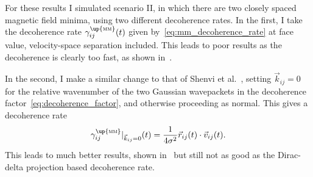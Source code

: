 For these results I simulated scenario II, in which there are two closely spaced magnetic field minima, using two different decoherence rates. In the first, I take the decoherence rate $\gamma^\up{\textsc{mm}}_{ij}(t)$ given by~\eqref{eq:mm_decoherence_rate} at face value, velocity-space separation included. This leads to poor results as the decoherence is clearly too fast, as shown in~.

In the second, I make a similar change to that of Shenvi et al.~\cite{doi:10.1063/1.3575588}, setting $\vec k_{ij} = 0$ for the relative wavenumber of the two Gaussian wavepackets in the decoherence factor~\eqref{eq:decoherence_factor}, and otherwise proceeding as normal. This gives a decoherence rate
\begin{align}
\gamma^\up{\textsc{mm}}_{ij}|_{\vec k_{ij} = 0}(t) = \frac{1}{4\sigma^2}\vec r_{ij}(t)\cdot\vec v_{ij}(t).
\end{align}
This leads to much better results, shown in~ but still not as good as the Dirac-delta projection based decoherence rate. 

